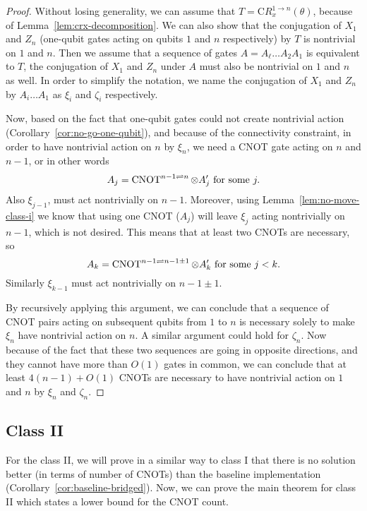 \begin{proof}
  Without losing generality, we can assume that $T = \mathrm{C}R_x^{1\to n}(\theta)$, because of Lemma~\ref{lem:crx-decomposition}. We can also show that the conjugation of $X_1$ and $Z_n$ (one-qubit gates acting on qubits $1$ and $n$ respectively) by $T$ is nontrivial on $1$ and $n$. Then we assume that a sequence of gates $A = A_\ell \dots A_2 A_1$ is equivalent to $T$, the conjugation of $X_1$ and $Z_n$ under $A$ must also be nontrivial on $1$ and $n$ as well. In order to simplify the notation, we name the conjugation of $X_1$ and $Z_n$ by $A_i \dots A_1$ as $\xi_i$ and $\zeta_i$ respectively. 
  
  Now, based on the fact that one-qubit gates could not create nontrivial action (Corollary~\ref{cor:no-go-one-qubit}), and because of the connectivity constraint, in order to have nontrivial action on $n$ by $\xi_n$, we need a CNOT gate acting on $n$ and $n-1$, or in other words
  \begin{equation}
    A_j = \operatorname{CNOT}^{n-1\rightleftharpoons n} \otimes A'_{j} \text{ for some } j.
  \end{equation}
  Also $\xi_{j - 1}$, must act nontrivially on $n-1$. Moreover, using Lemma~\ref{lem:no-move-class-i} we know that using one CNOT ($A_j$) will leave $\xi_{j}$ acting nontrivially on $n-1$, which is not desired. This means that at least two CNOTs are necessary, so 
  \begin{equation}
    A_k = \operatorname{CNOT}^{n-1 \rightleftharpoons n-1 \pm 1} \otimes A'_{k} \text{ for some } j < k.
  \end{equation}
  Similarly $\xi_{k-1}$ must act nontrivially on $n-1 \pm 1$.
  
  By recursively applying this argument, we can conclude that a sequence of CNOT pairs acting on subsequent qubits from $1$ to $n$ is necessary solely to make $\xi_n$ have nontrivial action on $n$. A similar argument could hold for $\zeta_n$. Now because of the fact that these two sequences are going in opposite directions, and they cannot have more than $O(1)$ gates in common, we can conclude that at least $4(n-1) + O(1)$ CNOTs are necessary to have nontrivial action on $1$ and $n$ by $\xi_n$ and $\zeta_n$.
\end{proof}

\subsection{Class II}

For the class II, we will prove in a similar way to class I that there is no solution better (in terms of number of CNOTs) than the baseline implementation (Corollary~\ref{cor:baseline-bridged}). 
Now, we can prove the main theorem for class II which states a lower bound for the CNOT count.

